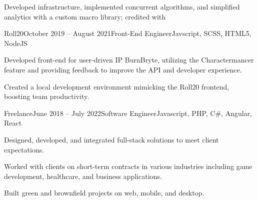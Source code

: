 \documentclass[10pt, letterpaper]{article}
\newenvironment{twocolentry}[2][]{ \onecolentry \def\secondColumn{#2} \setcolumnwidth{\fill, 10 cm}
\begin{paracol}{2} }{ \switchcolumn \raggedleft \secondColumn \end{paracol}
\endonecolentry } %
\begin{document}
\begin{samepage}
\begin{experienceSection}
			\item Developed infrastructure, implemented concurrent algorithms, and simplified
			analytics with a custom macro library; credited with 
		\end{experienceSection}

		\begin{experienceSection}
			{Roll20}{October 2019 -- August 2021}{Front-End Engineer}{Javscript, SCSS, HTML5, NodeJS}
			\item Developed front-end for user-driven IP BurnBryte, utilizing the Charactermancer
			feature and providing feedback to improve the API and developer experience.

			\item Created a local development environment mimicking the Roll20 frontend,
			boosting team productivity.
		\end{experienceSection}

		\begin{experienceSection}
			{Freelance}{June 2018 -- July 2022}{Software Engineer}{Javascript, PHP, C\#, Angular, React}
			\item Designed, developed, and integrated full-stack solutions to meet
			client expectations.

			\item Worked with clients on short-term contracts in various industries
			including game development, healthcare, and business applications.

			\item Built green and brownfield projects on web, mobile, and desktop.
		\end{experienceSection}
	\end{samepage}




\end{document}
